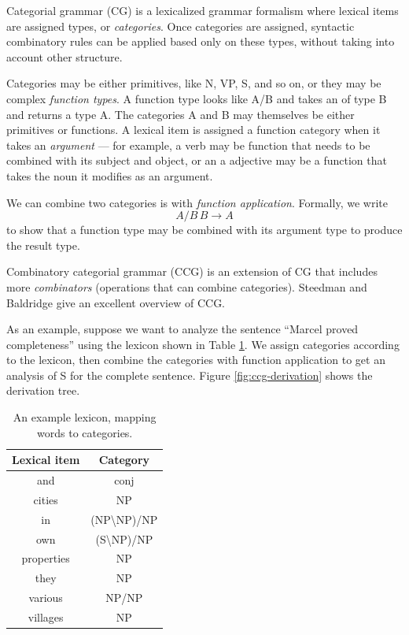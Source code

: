 \documentclass{article}
\begin{document}

Categorial grammar (CG) \cite{cg,bar-hillel-cg} is a lexicalized grammar formalism where lexical items are assigned types, or {\em categories}. Once categories are assigned, syntactic combinatory rules can be applied based only on these types, without taking into account other structure.

Categories may be either primitives, like N, VP, S, and so on, or they may be complex {\em function types}. A function type looks like A/B and takes an of type B and returns a type A. The categories A and B may themselves be either primitives or functions. A lexical item is assigned a function category when it takes an {\em argument} --- for example, a verb may be function that needs to be combined with its subject and object, or an a adjective may be a function that takes the noun it modifies as an argument.

We can combine two categories is with {\em function application}. Formally, we write
\begin{equation}
A/B \, B \to A \label{eqn:forward-app}
\end{equation}
to show that a function type may be combined with its argument type to produce the result type.

Combinatory categorial grammar (CCG) is an extension of CG that includes more {\em combinators} (operations that can combine categories). Steedman and Baldridge  give an excellent overview of CCG.

As an example, suppose we want to analyze the sentence ``Marcel proved completeness'' using the lexicon shown in Table \ref{table:lexicon}. We assign categories according to the lexicon, then combine the categories with function application to get an analysis of S for the complete sentence. Figure \ref{fig:ccg-derivation} shows the derivation tree.

\begin{table}
\centering
\begin{tabular}{|c|c|}
\hline
Lexical item & Category \\
\hline
and & conj \\
cities & NP \\
in &  (NP\textbackslash NP)/NP \\
own & (S\textbackslash NP)/NP \\
properties & NP \\
they & NP \\
various & NP/NP \\
villages & NP \\
\hline
\end{tabular}
\caption{An example lexicon, mapping words to categories.\label{table:lexicon}}
\end{table}
\end{document}
